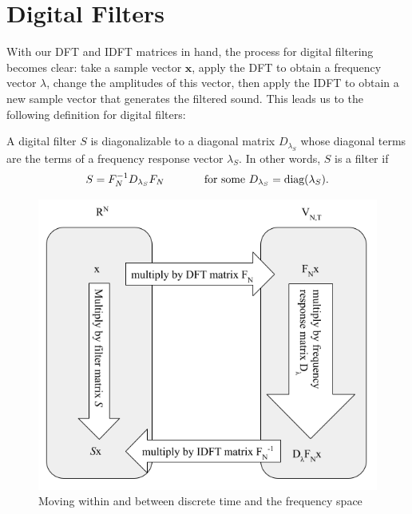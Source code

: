 
\newpage

\section{Digital Filters}

\par \indentt With our DFT and IDFT matrices in hand, the process for digital filtering becomes clear: take a sample vector $\mathbf{x}$, apply the DFT to obtain a frequency vector $\lambda$, change the amplitudes of this vector, then apply the IDFT to obtain a new sample vector that generates the filtered sound. This leads us to the following definition for digital filters:

\begin{definition}
    A digital filter $S$ is diagonalizable to a diagonal matrix $D_{\lambda_S}$ whose diagonal terms are the terms of a frequency response vector $\lambda_S$. In other words, $S$ is a filter if  $$S=F^{-1}_ND_{\lambda_S}F_N \hspace{.5in} \text{for some } D_{\lambda_S} = \text{diag}(\lambda_S).$$
    \label{defn:digital_filter}
\end{definition}

\begin{figure}[h]
    \centering
    \includegraphics[scale=.5]{digital_filter_space_diagram.png}
    \caption{Moving within and between discrete time and the frequency space}
    \label{fig:digital_filter_space_diagram}
\end{figure}

